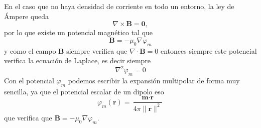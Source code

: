 \documentclass[11pt,a4paper]{article}
\numberwithin{equation}{section}
\begin{document}
En el caso que no haya densidad de corriente en todo un entorno, la ley de Ámpere queda \[\nabla \times \textbf{B} = \textbf{0},\] por lo que existe un potencial magnético tal que
\begin{equation}
    \textbf{B} = -\mu_0 \nabla \varphi_m
    \label{eq:m_potencial_escalar}
\end{equation}
y como el campo $\textbf{B}$ siempre verifica que $\nabla \cdot \textbf{B} = 0$ entonces siempre este potencial verifica la ecuación de Laplace, es decir siempre
\begin{equation}
    \nabla^2 \varphi_m = 0
    \label{eq:m_potencial_escalar_laplace}
\end{equation}
Con el potencial $\varphi_m$ podemos escribir la expansión multipolar de forma muy sencilla, ya que el potencial escalar de un dipolo eso
\begin{equation}
    \varphi_m(\textbf{r}) = \frac{\textbf{m} \cdot \textbf{r}}{4\pi\|\textbf{r}\|^2}
    \label{eq:m_potencial_escalar_dipolo}
\end{equation}
que verifica que $\textbf{B} = -\mu_0 \nabla \varphi_m$.
\end{document}
